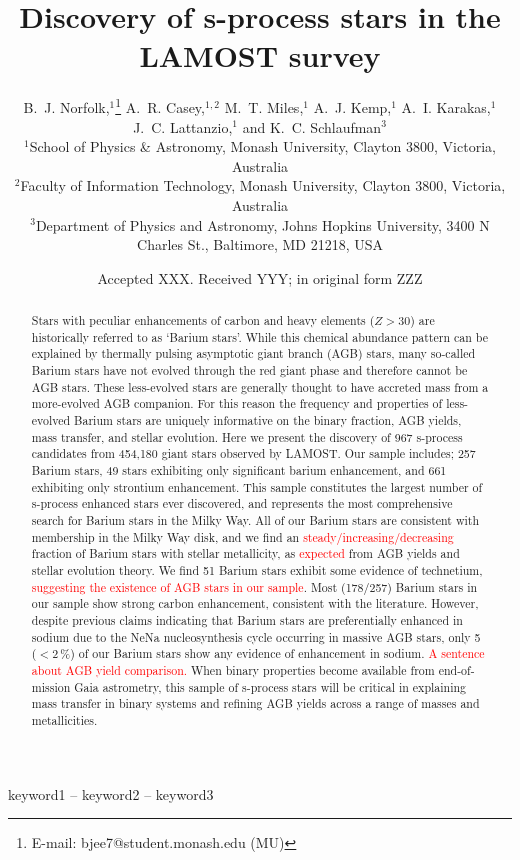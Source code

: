 \documentclass[a4paper,fleqn,usenatbib]{mnras}
\title[S-process stars in LAMOST]{Discovery of s-process stars in the LAMOST survey}
\author[B.~J. Norfolk et al.]{B.~J. Norfolk,$^{1}$\thanks{E-mail: bjee7@student.monash.edu (MU)}
A.~R. Casey,$^{1,2}$
M.~T. Miles,$^{1}$
A.~J. Kemp,$^{1}$ 
A.~I. Karakas,$^{1}$ \newauthor
J.~C. Lattanzio,$^{1}$
and K.~C. Schlaufman$^{3}$
\\
$^{1}$School of Physics \& Astronomy, Monash University, Clayton 3800, Victoria, Australia\\
$^{2}$Faculty of Information Technology, Monash University, Clayton 3800, Victoria, Australia\\
$^{3}$Department of Physics and Astronomy, Johns Hopkins University, 3400 N Charles St., Baltimore, MD 21218, USA
}
\date{Accepted XXX. Received YYY; in original form ZZZ}
\newcommand{\todo}[1]{\textcolor{red}{#1}}
\begin{document}
\label{firstpage}
\pagerange{\pageref{firstpage}--\pageref{lastpage}}
\maketitle

\begin{abstract}
Stars with peculiar enhancements of carbon and heavy elements ($Z > 30$) are historically referred to as `Barium stars'. While this chemical abundance pattern can be explained by thermally pulsing asymptotic giant branch (AGB) stars, many so-called Barium stars have not evolved through the red giant phase and therefore cannot be AGB stars. These less-evolved stars are generally thought to have accreted mass from a more-evolved AGB companion. For this reason the frequency and properties of less-evolved Barium stars are uniquely informative on the binary fraction, AGB yields, mass transfer, and stellar evolution. Here we present the discovery of 967 s-process candidates from 454,180 giant stars observed by LAMOST. Our sample includes; 257 Barium stars, 49 stars exhibiting only significant barium enhancement, and 661 exhibiting only strontium enhancement. This sample constitutes the largest number of s-process enhanced stars ever discovered, and represents the most comprehensive search for Barium stars in the Milky Way. All of our Barium stars are consistent with membership in the Milky Way disk, and we find an \todo{steady/increasing/decreasing} fraction of Barium stars with stellar metallicity, as \todo{expected} from AGB yields and stellar evolution theory. We find 51 Barium stars exhibit some evidence of technetium, \todo{suggesting the existence of AGB stars in our sample}. Most (178/257) Barium stars in our sample show strong carbon enhancement, consistent with the literature. However, despite previous claims indicating that Barium stars are preferentially enhanced in sodium due to the NeNa nucleosynthesis cycle occurring in massive AGB stars, only 5 ($<2$\,\%) of our Barium stars show any evidence of enhancement in sodium. \todo{A sentence about AGB yield comparison.} When binary properties become available from end-of-mission Gaia astrometry, this sample of s-process stars will be critical in explaining mass transfer in binary systems and refining AGB yields across a range of masses and metallicities.
\end{abstract}

\begin{keywords}
keyword1 -- keyword2 -- keyword3
\end{keywords}
\end{document}

